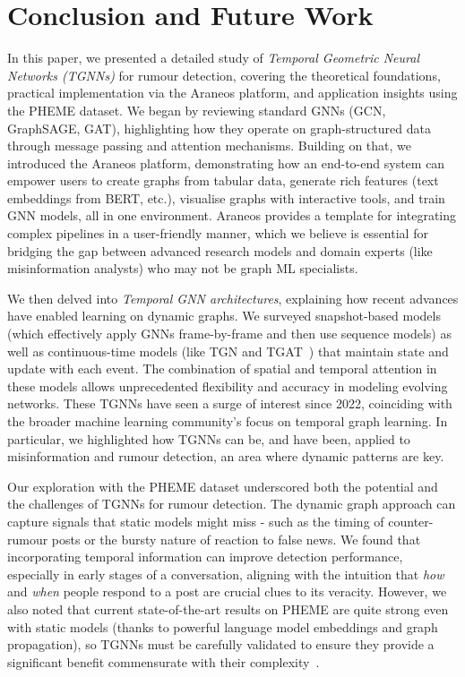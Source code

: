 \documentclass{cshonours}
\begin{document}
\chapter{Conclusion and Future Work}

In this paper, we presented a detailed study of \emph{Temporal Geometric Neural Networks (TGNNs)} for rumour detection, covering the theoretical foundations, practical implementation via the Araneos platform, and application insights using the PHEME dataset. We began by reviewing standard GNNs (GCN, GraphSAGE, GAT), highlighting how they operate on graph-structured data through message passing and attention mechanisms. Building on that, we introduced the Araneos platform, demonstrating how an end-to-end system can empower users to create graphs from tabular data, generate rich features (text embeddings from BERT, etc.), visualise graphs with interactive tools, and train GNN models, all in one environment. Araneos provides a template for integrating complex pipelines in a user-friendly manner, which we believe is essential for bridging the gap between advanced research models and domain experts (like misinformation analysts) who may not be graph ML specialists.

We then delved into \emph{Temporal GNN architectures}, explaining how recent advances have enabled learning on dynamic graphs. We surveyed snapshot-based models (which effectively apply GNNs frame-by-frame and then use sequence models) as well as continuous-time models (like TGN and TGAT~\cite{xu2020tgat}) that maintain state and update with each event. The combination of spatial and temporal attention in these models allows unprecedented flexibility and accuracy in modeling evolving networks. These TGNNs have seen a surge of interest since 2022, coinciding with the broader machine learning community's focus on temporal graph learning. In particular, we highlighted how TGNNs can be, and have been, applied to misinformation and rumour detection, an area where dynamic patterns are key.

Our exploration with the PHEME dataset underscored both the potential and the challenges of TGNNs for rumour detection. The dynamic graph approach can capture signals that static models might miss - such as the timing of counter-rumour posts or the bursty nature of reaction to false news. We found that incorporating temporal information can improve detection performance, especially in early stages of a conversation, aligning with the intuition that \emph{how} and \emph{when} people respond to a post are crucial clues to its veracity. However, we also noted that current state-of-the-art results on PHEME are quite strong even with static models (thanks to powerful language model embeddings and graph propagation), so TGNNs must be carefully validated to ensure they provide a significant benefit commensurate with their complexity~\cite{dynamic_gnn_survey_2024}.
\end{document}
